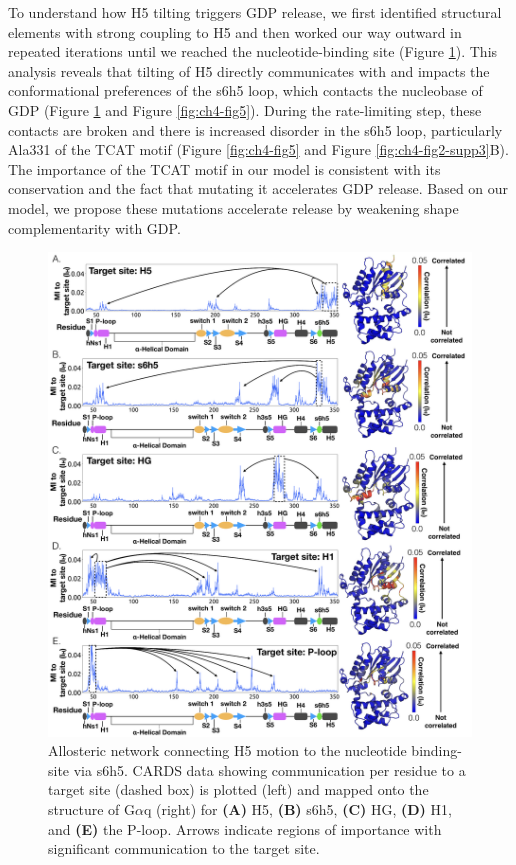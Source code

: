 \documentclass[../main.tex]{subfiles}
\begin{document}
        To understand how H5 tilting triggers GDP release, we first identified structural elements with strong coupling to H5 and then worked our way outward in repeated iterations until we reached the nucleotide-binding site (Figure \ref{fig:ch4-fig4}). This analysis reveals that tilting of H5 directly communicates with and impacts the conformational preferences of the s6h5 loop, which contacts the nucleobase of GDP (Figure \ref{fig:ch4-fig4} and Figure \ref{fig:ch4-fig5}). During the rate-limiting step, these contacts are broken and there is increased disorder in the s6h5 loop, particularly Ala331 of the TCAT motif (Figure \ref{fig:ch4-fig5} and Figure \ref{fig:ch4-fig2-supp3}B). The importance of the TCAT motif in our model is consistent with its conservation and the fact that mutating it accelerates GDP release\cite{Iiri:1994kw,Posner:1998gj,Thomas:1993wv}. Based on our model, we propose these mutations accelerate release by weakening shape complementarity with GDP.

        \begin{figure}[!htb] %
            \centering
            \includegraphics[width=\linewidth]{ch4-fig4.png}
            \caption[Allosteric network connecting H5 motion to the nucleotide binding-site via s6h5.]
                {Allosteric network connecting H5 motion to the nucleotide binding-site via s6h5. CARDS data showing communication per residue to a target site (dashed box) is plotted (left) and mapped onto the structure of G$\alpha$q (right) for \textbf{(A)} H5, \textbf{(B)} s6h5, \textbf{(C)} HG, \textbf{(D)} H1, and \textbf{(E)} the P-loop. Arrows indicate regions of importance with significant communication to the target site.}
            \label{fig:ch4-fig4}
        \end{figure}
\end{document}
